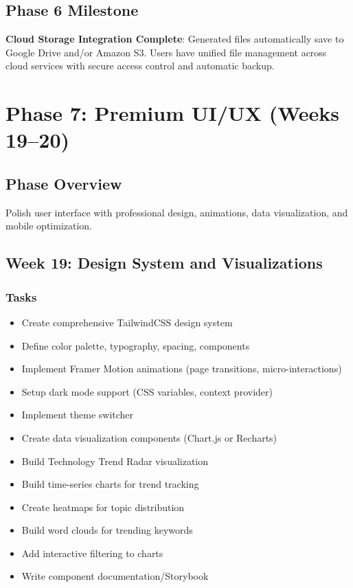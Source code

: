 \documentclass[12pt,oneside]{report}
\begin{document}
\subsection{Phase 6 Milestone}

\textbf{Cloud Storage Integration Complete}: Generated files automatically save to Google Drive and/or Amazon S3. Users have unified file management across cloud services with secure access control and automatic backup.

\section{Phase 7: Premium UI/UX (Weeks 19--20)}

\subsection{Phase Overview}

Polish user interface with professional design, animations, data visualization, and mobile optimization.

\subsection{Week 19: Design System and Visualizations}

\subsubsection{Tasks}

\begin{itemize}
    \item Create comprehensive TailwindCSS design system
    \item Define color palette, typography, spacing, components
    \item Implement Framer Motion animations (page transitions, micro-interactions)
    \item Setup dark mode support (CSS variables, context provider)
    \item Implement theme switcher
    \item Create data visualization components (Chart.js or Recharts)
    \item Build Technology Trend Radar visualization
    \item Build time-series charts for trend tracking
    \item Create heatmaps for topic distribution
    \item Build word clouds for trending keywords
    \item Add interactive filtering to charts
    \item Write component documentation/Storybook
\end{itemize}
\end{document}
